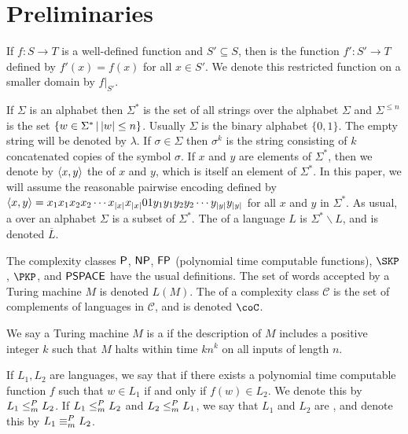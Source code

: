 \section{Preliminaries}
\label{sec:preliminaries}

If $f\colon S\to T$ is a well-defined function and $S'\subseteq S$, then  is the function $f'\colon S'\to T$ defined by $f'(x)=f(x)$ for all $x\in S'$.
We denote this restricted function on a smaller domain by $f|_{S'}$.

If $\Sigma$ is an alphabet then $\Sigma^*$ is the set of all strings over the alphabet $\Sigma$ and $\Sigma^{\leq n}$ is the set $\lb w\in\Sigma^* \st |w|\leq n \rb$.
Usually $\Sigma$ is the binary alphabet $\{0, 1\}$.
The empty string will be denoted by $\lambda$.
If $\sigma\in\Sigma$ then $\sigma^k$ is the string consisting of $k$ concatenated copies of the symbol $\sigma$.
If $x$ and $y$ are elements of $\Sigma^*$, then we denote by $\pair{x}{y}$ the  of $x$ and $y$, which is itself an element of $\Sigma^*$.
In this paper, we will assume the reasonable pairwise encoding defined by $\pair{x}{y}=x_1x_1x_2x_2\cdots x_{|x|}x_{|x|}01y_1y_1y_2y_2\cdots y_{|y|}y_{|y|}$ for all $x$ and $y$ in $\Sigma^*$.
As usual, a  over an alphabet $\Sigma$ is a subset of $\Sigma^*$.
The  of a language $L$ is $\Sigma^*\backslash L$, and is denoted $\overline{L}$.

The complexity classes $\P$, $\NP$, $\FP$ (polynomial time computable functions), $\SKP$, $\PKP$, and $\PSPACE$ have the usual definitions.
The set of words accepted by a Turing machine $M$ is denoted $L(M)$.
The  of a complexity class $\mathcal{C}$ is the set of complements of languages in $\mathcal{C}$, and is denoted $\coC$.

We say a Turing machine $M$ is a  if the description of $M$ includes a positive integer $k$ such that $M$ halts within time $kn^k$ on all inputs of length $n$.

If $L_1, L_2$ are languages, we say that  if there exists a polynomial time computable function $f$ such that $w\in L_1$ if and only if $f(w)\in L_2$.
We denote this by $L_1\mor L_2$.
If $L_1\mor L_2$ and $L_2\mor L_1$, we say that $L_1$ and $L_2$ are , and denote this by $L_1\moe L_2$.

